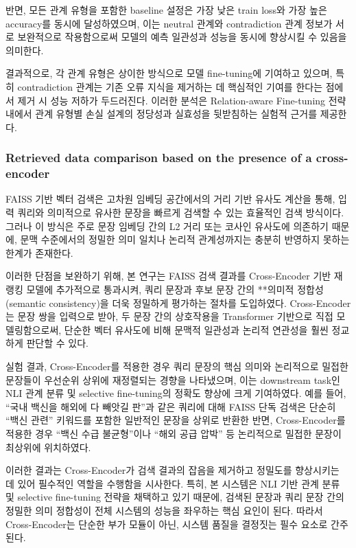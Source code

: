 \documentclass[a4paper,fleqn]{cas-sc}
\begin{document}
반면, 모든 관계 유형을 포함한 baseline 설정은 가장 낮은 train loss와 가장 높은 accuracy를 동시에 달성하였으며, 이는 neutral 관계와 contradiction 관계 정보가 서로 보완적으로 작용함으로써 모델의 예측 일관성과 성능을 동시에 향상시킬 수 있음을 의미한다.

결과적으로, 각 관계 유형은 상이한 방식으로 모델 fine-tuning에 기여하고 있으며, 특히 contradiction 관계는 기존 오류 지식을 제거하는 데 핵심적인 기여를 한다는 점에서 제거 시 성능 저하가 두드러진다. 이러한 분석은 Relation-aware Fine-tuning 전략 내에서 관계 유형별 손실 설계의 정당성과 실효성을 뒷받침하는 실험적 근거를 제공한다.

\subsubsection{Retrieved data comparison based on the presence of a cross-encoder}

FAISS 기반 벡터 검색은 고차원 임베딩 공간에서의 거리 기반 유사도 계산을 통해, 입력 쿼리와 의미적으로 유사한 문장을 빠르게 검색할 수 있는 효율적인 검색 방식이다. 그러나 이 방식은 주로 문장 임베딩 간의 L2 거리 또는 코사인 유사도에 의존하기 때문에, 문맥 수준에서의 정밀한 의미 일치나 논리적 관계성까지는 충분히 반영하지 못하는 한계가 존재한다.

이러한 단점을 보완하기 위해, 본 연구는 FAISS 검색 결과를 Cross-Encoder 기반 재랭킹 모델에 추가적으로 통과시켜, 쿼리 문장과 후보 문장 간의 **의미적 정합성(semantic consistency)을 더욱 정밀하게 평가하는 절차를 도입하였다. Cross-Encoder는 문장 쌍을 입력으로 받아, 두 문장 간의 상호작용을 Transformer 기반으로 직접 모델링함으로써, 단순한 벡터 유사도에 비해 문맥적 일관성과 논리적 연관성을 훨씬 정교하게 판단할 수 있다.

실험 결과, Cross-Encoder를 적용한 경우 쿼리 문장의 핵심 의미와 논리적으로 밀접한 문장들이 우선순위 상위에 재정렬되는 경향을 나타냈으며, 이는 downstream task인 NLI 관계 분류 및 selective fine-tuning의 정확도 향상에 크게 기여하였다. 예를 들어, “국내 백신을 해외에 다 빼앗길 판”과 같은 쿼리에 대해 FAISS 단독 검색은 단순히 “백신 관련” 키워드를 포함한 일반적인 문장을 상위로 반환한 반면, Cross-Encoder를 적용한 경우 “백신 수급 불균형”이나 “해외 공급 압박” 등 논리적으로 밀접한 문장이 최상위에 위치하였다.

이러한 결과는 Cross-Encoder가 검색 결과의 잡음을 제거하고 정밀도를 향상시키는 데 있어 필수적인 역할을 수행함을 시사한다. 특히, 본 시스템은 NLI 기반 관계 분류 및 selective fine-tuning 전략을 채택하고 있기 때문에, 검색된 문장과 쿼리 문장 간의 정밀한 의미 정합성이 전체 시스템의 성능을 좌우하는 핵심 요인이 된다. 따라서 Cross-Encoder는 단순한 부가 모듈이 아닌, 시스템 품질을 결정짓는 필수 요소로 간주된다.
\end{document}
